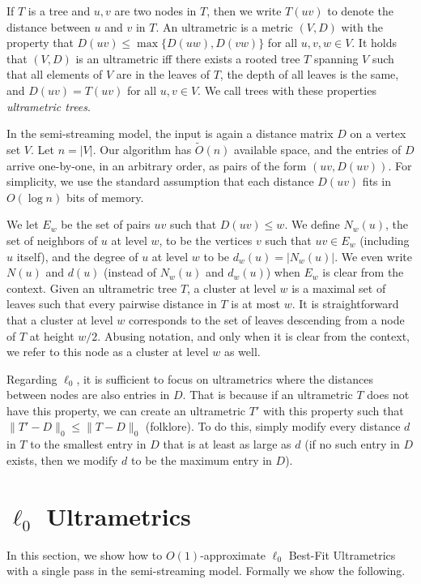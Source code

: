 \documentclass{article}
\newcommand{\set}[1]{\{#1\}}
\begin{document}
If $T$ is a tree and $u,v$ are two nodes in $T$, then we write $T(uv)$ to denote the distance between $u$ and $v$ in $T$.
An ultrametric is a metric $(V,D)$ with the property that $D(uv) \le \max\set{D(uw),D(vw)}$ for all $u,v,w\in V$.
It holds that $(V,D)$ is an ultrametric iff there exists a rooted tree $T$ spanning $V$ such that all elements of $V$ are in the leaves of $T$, the depth of all leaves is the same, and $D(uv)=T(uv)$ for all $u,v\in V$.
We call trees with these properties \emph{ultrametric trees}.

In the semi-streaming model, the input is again a distance matrix $D$ on a vertex set $V$.
Let $n=|V|$.
Our algorithm has $\widetilde{O}(n)$ available space, and the entries of $D$ arrive one-by-one, in an arbitrary order, as pairs of the form $(uv,D(uv))$.
For simplicity, we use the standard assumption that each distance $D(uv)$ fits in $O(\log{n})$ bits of memory.

We let $E_w$ be the set of pairs $uv$ such that $D(uv) \le w$. 
We define $N_w(u)$, the set of neighbors of $u$ at level $w$, to be the vertices $v$ such that $uv \in E_w$ (including $u$ itself), and the degree of $u$ at level $w$ to be $d_w(u) = |N_w(u)|$.
We even write $N(u)$ and $d(u)$ (instead of $N_w(u)$ and $d_w(u)$) when $E_w$ is clear from the context.
Given an ultrametric tree $T$, a cluster at level $w$ is a maximal set of leaves such that every pairwise distance in $T$ is at most $w$.
It is straightforward that a cluster at level $w$ corresponds to the set of leaves descending from a node of $T$ at height $w/2$.
Abusing notation, and only when it is clear from the context, we refer to this node as a cluster at level $w$ as well.

Regarding $\ell_0$, it is sufficient to focus on ultrametrics where the distances between nodes are also entries in $D$.
That is because if an ultrametric $T$ does not have this property, we can create an ultrametric $T'$ with this property such that $\|T'-D\|_0 \le \|T-D\|_0$ (folklore).
To do this, simply modify every distance $d$ in $T$ to the smallest entry in $D$ that is at least as large as $d$ (if no such entry in $D$ exists, then we modify $d$ to be the maximum entry in $D$).

\newcommand{\sizes}{\mathbb{S}}
\newcommand{\counter}{counter}

\section{\texorpdfstring{$\ell_0$ Ultrametrics}{l-0 Ultrametrics}} \label{section:l0ultra}
In this section, we show how to $O(1)$-approximate $\ell_0$ Best-Fit Ultrametrics with a single pass in the semi-streaming model. Formally we show the following.
\end{document}
